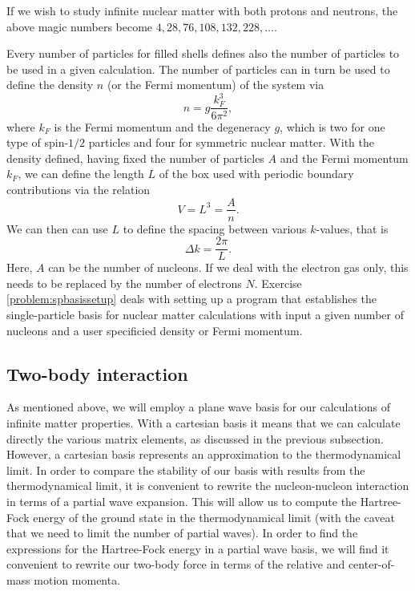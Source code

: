 If we wish to study infinite nuclear matter with both protons and
neutrons, the above magic numbers become $4, 28, 76, 108, 132, 228, \dots$.

Every number of particles for filled shells defines also the number of
particles to be used in a given calculation. The number of
particles can in turn be used to define the density $n$ (or the Fermi momentum) of the system via
\[
n = g \frac{k_F^3}{6\pi^2},
\]
where $k_F$ is the Fermi momentum and the degeneracy $g$, which is two
for one type of spin-$1/2$ particles and four for symmetric nuclear
matter.  With the density defined, having fixed the number of particles $A$ and the Fermi momentum $k_F$,
we can define the length $L$ of the box used with periodic
boundary contributions via the relation
\[
  V= L^3= \frac{A}{n}.
\]
We can then  can use $L$ to define the spacing between
various $k$-values, that is
\[
  \Delta k = \frac{2\pi}{L}.
\]
Here, $A$ can be the number of nucleons. If we deal with the electron
gas only, this needs to be replaced by the number of electrons $N$.
Exercise \ref{problem:spbasissetup} deals with setting up a program that establishes the   single-particle basis
for nuclear matter calculations with input a given number of nucleons and a user specificied 
density or Fermi momentum.


\subsection{Two-body interaction}

As mentioned above, we will employ a plane wave basis
for our calculations of infinite matter properties. With a cartesian
basis it means that we can calculate directly the various matrix
elements, as discussed in the previous subsection. However, a
cartesian basis represents an approximation to the thermodynamical limit. In
order to compare the stability of our basis with results from the
thermodynamical limit, it is convenient to rewrite the nucleon-nucleon
interaction in terms of a partial wave expansion. This will allow us
to compute the Hartree-Fock energy of the ground state in the
thermodynamical limit (with the caveat that we need to limit the
number of partial waves). In order to find the expressions for the
Hartree-Fock energy in a partial wave basis, we will find it
convenient to rewrite our two-body force in terms of the relative and
center-of-mass motion momenta.


